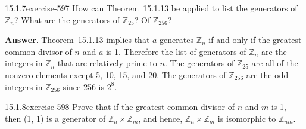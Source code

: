 \documentclass[twoside,10pt,]{book}
\numberwithin{equation}{section}
\begin{document}
\begin{divisionsolution}{15.1.7}{}{exercise-597}%
\hypertarget{p-5356}{}%
How can Theorem~15.1.13 be applied to list the generators of \(\mathbb{Z}_n\)? What are the generators of \(\mathbb{Z}_{25}\)? Of \(\mathbb{Z}_{256}\)?%
\par\smallskip%
\noindent\textbf{Answer}.\quad%
\hypertarget{p-5357}{}%
Theorem~15.1.13 implies that \(a\) generates \(\mathbb{Z}_n\) if and only if the greatest common divisor of \(n\) and \(a\) is 1. Therefore the list of generators of \(\mathbb{Z}_n\) are the integers in \(\mathbb{Z}_n\) that are relatively prime to \(n\). The generators of \(\mathbb{Z}_{25}\) are all of the nonzero elements except 5, 10, 15, and 20. The generators of \(\mathbb{Z}_{256}\) are the odd integers in \(\mathbb{Z}_{256}\)  since 256 is \(2^8\).%
\end{divisionsolution}%
\begin{divisionsolution}{15.1.8}{}{exercise-598}%
\hypertarget{p-5358}{}%
Prove that if the greatest common divisor of \(n\) and \(m\) is 1, then (1, 1) is a generator of \(\mathbb{Z}_n\times \mathbb{Z}_m\), and hence, \(\mathbb{Z}_n\times \mathbb{Z}_m\) is isomorphic to  \(\mathbb{Z}_{n m}\).%
\end{divisionsolution}%
\end{document}
